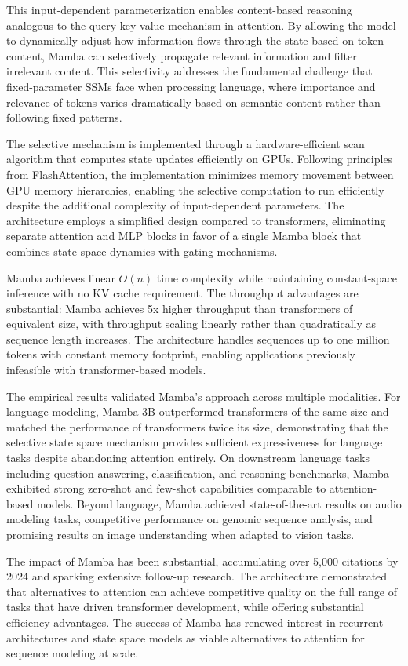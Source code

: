 \documentclass[11pt,letterpaper]{article}
\begin{document}
This input-dependent parameterization enables content-based reasoning analogous to the query-key-value mechanism in attention. By allowing the model to dynamically adjust how information flows through the state based on token content, Mamba can selectively propagate relevant information and filter irrelevant content. This selectivity addresses the fundamental challenge that fixed-parameter SSMs face when processing language, where importance and relevance of tokens varies dramatically based on semantic content rather than following fixed patterns.

The selective mechanism is implemented through a hardware-efficient scan algorithm that computes state updates efficiently on GPUs. Following principles from FlashAttention, the implementation minimizes memory movement between GPU memory hierarchies, enabling the selective computation to run efficiently despite the additional complexity of input-dependent parameters. The architecture employs a simplified design compared to transformers, eliminating separate attention and MLP blocks in favor of a single Mamba block that combines state space dynamics with gating mechanisms.

Mamba achieves linear $O(n)$ time complexity while maintaining constant-space inference with no KV cache requirement. The throughput advantages are substantial: Mamba achieves 5x higher throughput than transformers of equivalent size, with throughput scaling linearly rather than quadratically as sequence length increases. The architecture handles sequences up to one million tokens with constant memory footprint, enabling applications previously infeasible with transformer-based models.

The empirical results validated Mamba's approach across multiple modalities. For language modeling, Mamba-3B outperformed transformers of the same size and matched the performance of transformers twice its size, demonstrating that the selective state space mechanism provides sufficient expressiveness for language tasks despite abandoning attention entirely. On downstream language tasks including question answering, classification, and reasoning benchmarks, Mamba exhibited strong zero-shot and few-shot capabilities comparable to attention-based models. Beyond language, Mamba achieved state-of-the-art results on audio modeling tasks, competitive performance on genomic sequence analysis, and promising results on image understanding when adapted to vision tasks.

The impact of Mamba has been substantial, accumulating over 5,000 citations by 2024 and sparking extensive follow-up research. The architecture demonstrated that alternatives to attention can achieve competitive quality on the full range of tasks that have driven transformer development, while offering substantial efficiency advantages. The success of Mamba has renewed interest in recurrent architectures and state space models as viable alternatives to attention for sequence modeling at scale.
\end{document}
